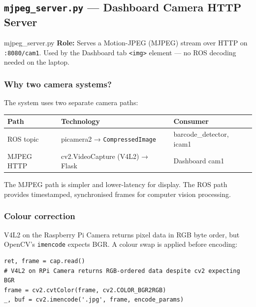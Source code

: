 \documentclass[11pt,a4paper]{article}
\begin{document}
\subsection{\texttt{mjpeg\_server.py} — Dashboard Camera HTTP Server}

\begin{filebox}{mjpeg\_server.py}
\textbf{Role:} Serves a Motion-JPEG (MJPEG) stream over HTTP on
\texttt{:8080/cam1}. Used by the Dashboard tab \texttt{<img>} element —
no ROS decoding needed on the laptop.
\end{filebox}

\subsubsection{Why two camera systems?}

The system uses two separate camera paths:

\begin{center}
\begin{tabular}{lll}
  \toprule
  \textbf{Path} & \textbf{Technology} & \textbf{Consumer} \\
  \midrule
  ROS topic & picamera2 → \texttt{CompressedImage} & barcode\_detector, icam1 \\
  MJPEG HTTP & cv2.VideoCapture (V4L2) → Flask & Dashboard cam1 \\
  \bottomrule
\end{tabular}
\end{center}

The MJPEG path is simpler and lower-latency for display. The ROS path provides
timestamped, synchronised frames for computer vision processing.

\subsubsection{Colour correction}

V4L2 on the Raspberry Pi Camera returns pixel data in RGB byte order, but
OpenCV's \texttt{imencode} expects BGR. A colour swap is applied before
encoding:

\begin{lstlisting}[style=python, caption=V4L2 colour order fix in mjpeg\_server.py]
ret, frame = cap.read()
# V4L2 on RPi Camera returns RGB-ordered data despite cv2 expecting BGR
frame = cv2.cvtColor(frame, cv2.COLOR_BGR2RGB)
_, buf = cv2.imencode('.jpg', frame, encode_params)
\end{lstlisting}
\end{document}
